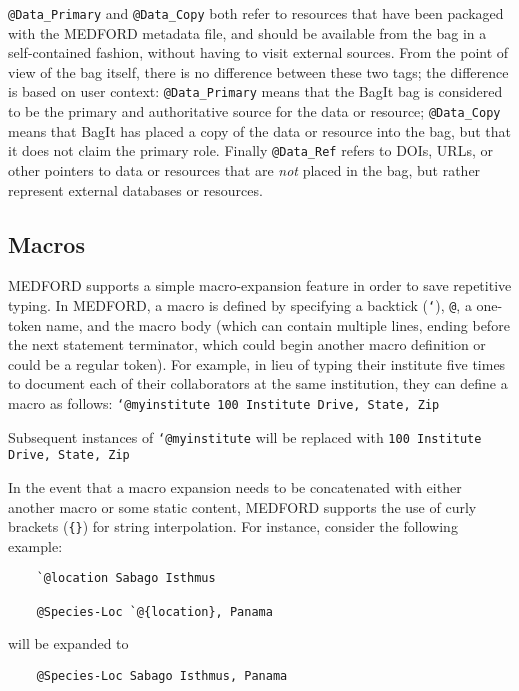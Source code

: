\documentclass[10pt]{article}
\begin{document}
\texttt{@Data\_Primary} and \texttt{@Data\_Copy} both refer to resources that have been packaged with the MEDFORD metadata file, and should be available from the bag in a self-contained fashion, without having to visit external sources. From the point of view of the bag itself, there is no difference between these two tags; the difference is based on user context: \texttt{@Data\_Primary} means that the BagIt bag is considered to be the primary and authoritative source for the data or resource; \texttt{@Data\_Copy} means that BagIt has placed a copy of the data or resource into the bag, but that it does not claim the primary role. Finally \texttt{@Data\_Ref} refers to DOIs, URLs, or other pointers to data or resources that are {\em not} placed in the bag, but rather represent external databases or resources. 
    
\subsection{Macros} \label{macros}

MEDFORD supports a simple macro-expansion feature in order to save repetitive typing. In MEDFORD, a macro is defined by specifying a backtick (\texttt{`}), \texttt{@}, a one-token name, and the macro body (which can contain multiple lines, ending before the next statement terminator, which could begin another macro definition or could be a regular token). For example, in lieu of typing their institute five times to document each of their collaborators at the same institution, they can define a macro as follows:
\texttt{`@myinstitute 100 Institute Drive, State, Zip}

Subsequent instances of \texttt{`@myinstitute} will be replaced with \texttt{100 Institute Drive, State, Zip}

In the event that a macro expansion needs to be concatenated with either another macro or some static content, MEDFORD supports the use of curly brackets (\texttt{\{\}}) for string interpolation. For instance, consider the following example:

\begin{verbatim}
    `@location Sabago Isthmus
    
    @Species-Loc `@{location}, Panama
\end{verbatim}

will be expanded to

\begin{verbatim}
    @Species-Loc Sabago Isthmus, Panama
\end{verbatim}
\end{document}
